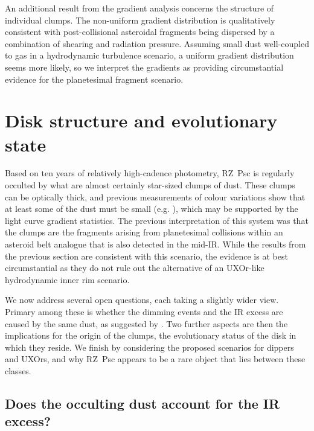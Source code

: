 \documentclass[]{rsos}
\begin{document}
An additional result from the gradient analysis concerns the structure of individual
clumps. The non-uniform gradient distribution is qualitatively consistent with
post-collisional asteroidal fragments being dispersed by a combination of shearing and
radiation pressure. Assuming small dust well-coupled to gas in a hydrodynamic turbulence
scenario, a uniform gradient distribution seems more likely, so we interpret the
gradients as providing circumstantial evidence for the planetesimal fragment scenario.

\section{Disk structure and evolutionary state}\label{s:disk}

Based on ten years of relatively high-cadence photometry, RZ~Psc is regularly occulted by
what are almost certainly star-sized clumps of dust. These clumps can be optically thick,
and previous measurements of colour variations show that at least some of the dust must
be small (e.g. \cite{2003ARep...47..580S}), which may be supported by the light curve
gradient statistics. The previous interpretation of this system was that the clumps are
the fragments arising from planetesimal collisions within an asteroid belt analogue that
is also detected in the mid-IR. While the results from the previous section are
consistent with this scenario, the evidence is at best circumstantial as they do not rule
out the alternative of an UXOr-like hydrodynamic inner rim scenario.

We now address several open questions, each taking a slightly wider view. Primary among
these is whether the dimming events and the IR excess are caused by the same dust, as
suggested by \cite{2013A&A...553L...1D}. Two further aspects are then the implications
for the origin of the clumps, the evolutionary status of the disk in which they
reside. We finish by considering the proposed scenarios for dippers and UXOrs, and why
RZ~Psc appears to be a rare object that lies between these classes.

\subsection{Does the occulting dust account for the IR excess?}\label{ss:ir}
\end{document}
